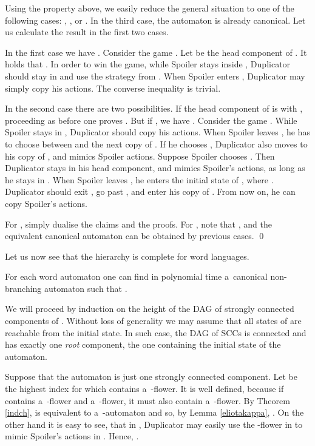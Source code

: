 \documentclass{LMCS}
\begin{document}
Using the property above, we easily reduce the general situation to one of the following cases: , , or .  In the third case, the automaton is already canonical. Let us calculate the result in the first two cases. 

In the first case we have . Consider the game . Let  be the head component of . It holds that . In order to win the game, while Spoiler stays inside , Duplicator should stay in  and use the strategy from . When  Spoiler enters , Duplicator may simply copy his actions. The converse inequality is trivial.

In the second case  there are two possibilities. If the head component of  is  with , proceeding as before one proves . But if , we have . Consider the game . While Spoiler stays in , Duplicator should copy his actions. When Spoiler leaves , he has to choose between  and the next copy of . If he chooses , Duplicator also moves to his copy of , and mimics Spoiler actions. Suppose Spoiler chooses . Then Duplicator stays in his head component, and mimics  Spoiler's actions, as long as he stays in . When Spoiler leaves , he enters the initial state of , where . Duplicator should exit , go past ,  and enter his copy of . From now on, he can copy Spoiler's actions. 

For , simply dualise the claims and the proofs. For  , note that , and the equivalent canonical automaton can be obtained by previous cases. \qed

\vspace{5pt} 

Let us now see that the hierarchy is complete for word languages.

\begin{thm} \label{wagner}
For each word automaton  one can find in polynomial time a~canonical non-branching automaton  such that .
\end{thm}

\proof We will proceed by induction on the height of the DAG of
strongly connected components of . Without loss of generality we
may assume that all states of  are reachable from the initial
state. In such case, the DAG of SCCs is connected and has exactly one {\em root}
component, the one containing the initial state of the automaton. 

 Suppose that the automaton is just one strongly connected component. Let  be the highest index for which  contains  a~-flower. It is well defined, because if  contains a~-flower and a~-flower, it must also contain a~-flower. By Theorem \ref{indch},  is equivalent to a~-automaton and so, by Lemma \ref{eliotakappa}, . On the other hand it is easy to see, that in , Duplicator may easily use the -flower in  to mimic Spoiler's actions in . Hence, . 
\end{document}
